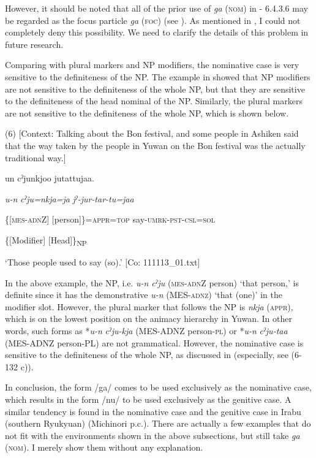 However, it should be noted that all of the prior use of \textit{ga} (\textsc{nom}) in  - 6.4.3.6 may be regarded as the focus particle \textit{ga} (\textsc{foc}) (see ). As mentioned in , I could not completely deny this possibility. We need to clarify the details of this problem in future research.

Comparing with plural markers and NP modifiers, the nominative case is very sensitive to the definiteness of the NP. The example  in  showed that NP modifiers are not sensitive to the definiteness of the whole NP, but that they are sensitive to the definiteness of the head nominal of the NP. Similarly, the plural markers are not sensitive to the definiteness of the whole NP, which is shown below.

(6)  [Context: Talking about the Bon festival, and some people in Ashiken said that the way taken by the people in Yuwan on the Bon festival was the actually traditional way.]

{\TM}
\gll un  cˀjunkjoo  jutattujaa.

    \textit{u-n}  \textit{cˀju=nkja=ja}  \textit{jˀ-jur-tar-tu=jaa}

    \{[\textsc{mes}-\textsc{adn}Z]  [person]\}=\textsc{appr}=\textsc{top}  say-\textsc{umrk}-\textsc{pst}-\textsc{csl}=\textsc{sol}

    \{[Modifier]  [Head]\}\textsubscript{NP}  

\glt    ‘Those people used to say (so).’ [Co: 111113\_01.txt]
\z

In the above example, the NP, i.e. \textit{u-n} \textit{cˀju} (\textsc{mes}-\textsc{adn}Z person) ‘that person,’ is definite since it has the demonstrative \textit{u-n} (MES-\textsc{adnz}) ‘that (one)’ in the modifier slot. However, the plural marker that follows the NP is \textit{nkja} (\textsc{appr}), which is on the lowest position on the animacy hierarchy in Yuwan. In other words, such forms as *\textit{u-n} \textit{cˀju-kja} (MES-ADNZ person-\textsc{pl}) or *\textit{u-n} \textit{cˀju-taa} (MES-ADNZ person-PL) are not grammatical. However, the nominative case is sensitive to the definiteness of the whole NP, as discussed in  (especially, see (6-132 c)).

  In conclusion, the form /ga/ comes to be used exclusively as the nominative case, which results in the form /nu/ to be used exclusively as the genitive case. A similar tendency is found in the nominative case and the genitive case in Irabu (southern Ryukyuan) (Michinori \citealt{Shimoji2013} p.c.). There are actually a few examples that do not fit with the environments shown in the above subsections, but still take \textit{ga} (\textsc{nom}). I merely show them without any explanation.

